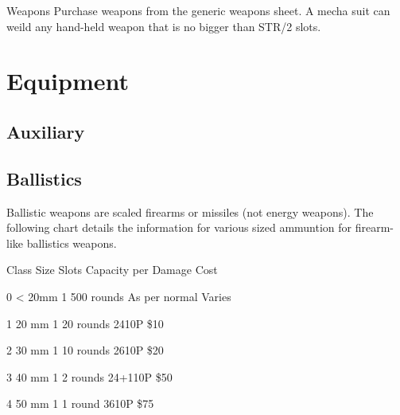 \documentclass[twoside]{book}
\begin{document}
                
                Weapons  
                    Purchase weapons from the generic weapons
                   sheet. 
                   A mecha suit can weild any hand-held weapon that
                   is no bigger than STR/2 slots. 
                
            
\section{Equipment}
    
\subsection{Auxiliary}
    
\subsection{Ballistics}
      Ballistic weapons are scaled firearms or missiles
               (not energy weapons). The following chart details the
               information for various sized ammuntion for firearm-like
               ballistics weapons.   
                
                  
                   Class   
                   Size   
                   Slots   
                   Capacity per   
                   Damage   
                   Cost   
                  
                  
                   0   
                   < 20mm   
                   1   
                   500 rounds   
                   As per normal   
                   Varies   
                  
                  
                   1   
                   20 mm   
                   1   
                   20 rounds   
                   2410P   
                   \$10   
                  
                  
                   2   
                   30 mm   
                   1   
                   10 rounds   
                   2610P   
                   \$20   
                  
                  
                   3   
                   40 mm   
                   1   
                   2 rounds   
                   24+110P   
                   \$50   
                  
                  
                   4   
                   50 mm   
                   1   
                   1 round   
                   3610P   
                   \$75   
                  
\end{document}
